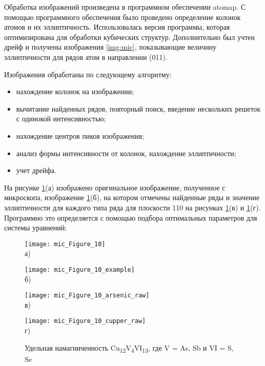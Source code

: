 Обработка изображений произведена в программном обеспечении atomap\cite{Nord2017}. С помощью программного обеспечения было проведено определение колонок атомов и их эллиптичность. Использовалась версия программы, которая оптимизирована для обработки кубических структур. Дополнительно был учтен дрейф и получены изображения \ref{img:mic}, показывающие величину эллиптичности для рядов атом в направлении (011).

Изображения обработаны по следующему алгоритму:
\begin{itemize}
\item нахождение колонок на изображении;

\item вычитание найденных рядов, повторный поиск, введение нескольких решеток с одинокой интенсивностью;

\item нахождение центров пиков изображения;

\item анализ формы интенсивности от колонок, нахождение эллиптичности;

\item учет дрейфа.
\end{itemize}

На рисунке \ref{img:mic1}(а) изображено оригинальное изображение, полученное с микроскопа, изображение \ref{img:mic1}(б), на котором отмечены найденные ряды и значение эллиптичности для каждого типа ряда для плоскости 110 на рисунках \ref{img:mic1}(в) и \ref{img:mic1}(г).
Программно это определяется с помощью подбора оптимальных параметров для системы уравнений:
\begin{figure}[p!]
  \begin{minipage}[ht]{0.5\linewidth}\centering
    \texttt{[image: mic\_Figure\_10]} \\ а)
  \end{minipage}
  \hfill
  \begin{minipage}[ht]{0.5\linewidth}\centering
    \texttt{[image: mic\_Figure\_10\_example]} \\ б)
  \end{minipage}
\vfill
  \begin{minipage}[ht]{0.5\linewidth}\centering
    \texttt{[image: mic\_Figure\_10\_arsenic\_raw]} \\ в)
  \end{minipage}
  \hfill
  \begin{minipage}[ht]{0.5\linewidth}\centering
    \texttt{[image: mic\_Figure\_10\_cupper\_raw]} \\ г)
  \end{minipage}

      \caption[Удельная намагниченность Cu\textsubscript{12}As\textsubscript{4}S\textsubscript{13}]{Удельная намагниченность Cu\textsubscript{12}V\textsubscript{4}VI\textsubscript{13}, где V = As, Sb и VI = S, Se}
    \label{img:mic1}
\end{figure}

